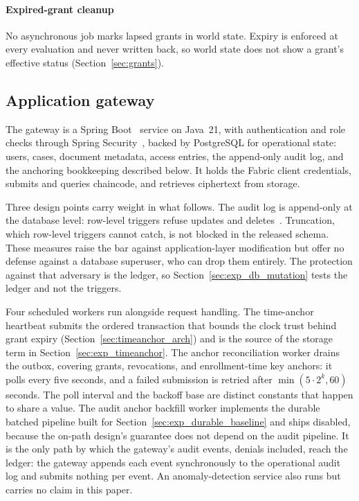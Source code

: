\documentclass[preprint,12pt]{elsarticle}
\begin{document}
\paragraph{Expired-grant cleanup}
No asynchronous job marks lapsed grants in world state. Expiry is enforced
at every evaluation and never written back, so world state does not show a
grant's effective status (Section~\ref{sec:grants}).

\subsection{Application gateway}
\label{sec:backend}

The gateway is a Spring Boot~\cite{springBoot325} service on Java~21, with
authentication and role checks through Spring
Security~\cite{springSecurity}, backed by PostgreSQL for operational state: users, cases, document metadata, access entries, the
append-only audit log, and the anchoring bookkeeping described below. It holds
the Fabric client credentials, submits and queries chaincode, and retrieves
ciphertext from storage.

Three design points carry weight in what follows. The audit log is
append-only at the database level: row-level triggers refuse updates and
deletes~\cite{postgresqlTriggers}. Truncation, which row-level triggers
cannot catch, is not blocked in the released schema. These measures raise the bar
against application-layer modification but offer no defense against a database
superuser, who can drop them entirely. The protection against that adversary is
the ledger, so Section~\ref{sec:exp_db_mutation} tests the ledger and not the
triggers.

Four scheduled workers run alongside request handling. The time-anchor
heartbeat submits the ordered transaction that bounds the clock trust behind
grant expiry (Section~\ref{sec:timeanchor_arch}) and is the source of the storage term in
Section~\ref{sec:exp_timeanchor}. The anchor reconciliation worker drains
the outbox, covering grants, revocations, and enrollment-time key anchors: it polls
every five seconds, and a failed submission is retried after
$\min(5 \cdot 2^{k}, 60)$ seconds. The poll interval and the backoff base
are distinct constants that happen to share a value. The audit
anchor backfill worker implements the durable batched pipeline built for
Section~\ref{sec:exp_durable_baseline} and ships disabled, because the
on-path design's guarantee does not depend on the audit pipeline. It is
the only path by which the gateway's audit events, denials included,
reach the ledger: the gateway appends each event synchronously to the
operational audit log and submits nothing per event. An
anomaly-detection service also runs but carries no claim in this paper.
\end{document}
